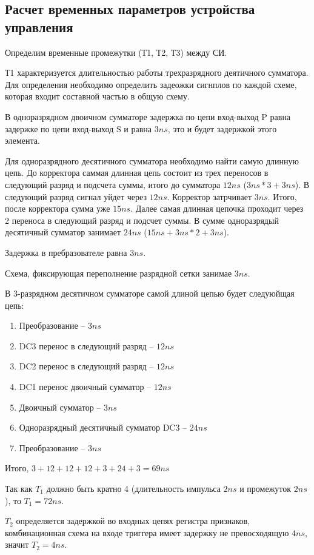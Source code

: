 \documentclass[a4paper,14pt]{article}
\begin{document}
\subsection{Расчет временных параметров устройства управления}

Определим временные промежутки (Т1, Т2, Т3) между СИ.

Т1 характеризуется длительностью работы трехразрядного деятичного сумматора.
Для определения необходимо определить задеожки сигнплов по каждой схеме, которая входит составной частью в общую схему.

В одноразрядном двоичном сумматоре задержка по цепи вход-выход P равна задержке по цепи вход-выход S и равна $3ns$, это и будет задержкой этого элемента.

Для одноразрядного десятичного сумматора необходимо найти самую длинную цепь. До корректора саммая длинная цепь состоит из трех переносов в следующий разряд и подсчета суммы, итого до сумматора $12ns$ ($3ns * 3 + 3ns$).
В следующий разряд сигнал уйдет через $12ns$.
Корректор затрчивает $3ns$. Итого, после корректора сумма уже $15ns$.
Далее самая длинная цепочка проходит через 2 переноса в следующий разряд и подсчет суммы.
В сумме одноразрядый десятичный сумматор занимает $24ns$ ($15ns + 3ns * 2 + 3 ns$).

Задержка в пребразователе равна $3ns$.

Схема, фиксирующая переполнение разрядной сетки занимае  $3ns$.

В 3-разрядном десятичном сумматоре самой длиной цепью будет следуюйщая цепь:
\begin{enumerate}
	\item Преобразование -- $3ns$
	\item DC3 перенос в следующий разряд -- $12ns$
	\item DC2 перенос в следующий разряд -- $12ns$
	\item DC1 перенос двоичный сумматор -- $12ns$
	\item Двоичный сумматор -- $3ns$
	\item Одноразрядный десятичный сумматор DC3 -- $24ns$
	\item Преобразование -- $3ns$
\end{enumerate}

Итого, $3 + 12 + 12 + 12 + 3 + 24 + 3 = 69ns$

Так как $T_1$ должно быть кратно 4 (длительность  импульса $2ns$ и промежуток $2ns$), то $T_1 = 72ns$.

$T_2$ определяется задержкой во входных цепях регистра признаков, комбинационная схема на входе триггера имеет задержку не превосходящую $4ns$, значит $T_2 = 4ns$.
\end{document}

